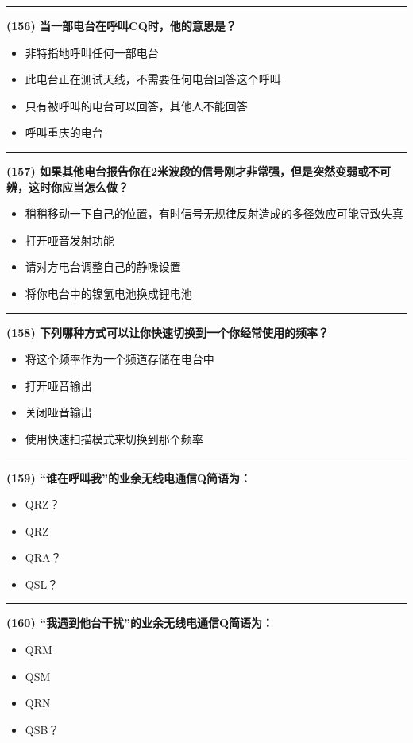 \documentclass[twocolumn]{ctexart}  %
\begin{document}
\noindent\rule{0.5\textwidth}{1pt}
\heiti \textbf{(156) 当一部电台在呼叫CQ时，他的意思是？} \songti {\color{gray} [LK1098] }
\begin{itemize}
	\item  非特指地呼叫任何一部电台
	\item  此电台正在测试天线，不需要任何电台回答这个呼叫
	\item  只有被呼叫的电台可以回答，其他人不能回答
	\item  呼叫重庆的电台
\end{itemize}


\noindent\rule{0.5\textwidth}{1pt}
\heiti \textbf{(157) 如果其他电台报告你在2米波段的信号刚才非常强，但是突然变弱或不可辨，这时你应当怎么做？} \songti {\color{gray} [LK1102] }
\begin{itemize}
	\item  稍稍移动一下自己的位置，有时信号无规律反射造成的多径效应可能导致失真
	\item  打开哑音发射功能
	\item  请对方电台调整自己的静噪设置
	\item  将你电台中的镍氢电池换成锂电池
\end{itemize}


\noindent\rule{0.5\textwidth}{1pt}
\heiti \textbf{(158) 下列哪种方式可以让你快速切换到一个你经常使用的频率？} \songti {\color{gray} [LK1131] }
\begin{itemize}
	\item  将这个频率作为一个频道存储在电台中
	\item  打开哑音输出
	\item  关闭哑音输出
	\item  使用快速扫描模式来切换到那个频率
\end{itemize}


\noindent\rule{0.5\textwidth}{1pt}
\heiti \textbf{(159) “谁在呼叫我”的业余无线电通信Q简语为：} \songti {\color{gray} [LK0287] }
\begin{itemize}
	\item  QRZ？
	\item  QRZ
	\item  QRA？
	\item  QSL？
\end{itemize}


\noindent\rule{0.5\textwidth}{1pt}
\heiti \textbf{(160) “我遇到他台干扰”的业余无线电通信Q简语为：} \songti {\color{gray} [LK0292] }
\begin{itemize}
	\item  QRM
	\item  QSM
	\item  QRN
	\item  QSB？
\end{itemize}
\end{document}
